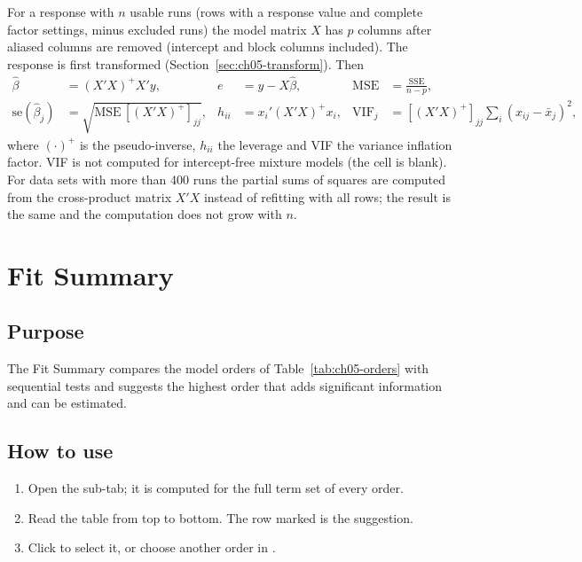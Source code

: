 For a response with $n$ usable runs (rows with a response value and complete factor settings, minus
excluded runs) the model matrix $X$ has $p$ columns after aliased columns are removed (intercept and block
columns included). The response is first transformed (Section~\ref{sec:ch05-transform}). Then
\begin{align}
  \hat\beta&=(X'X)^{+}X'y, &
  e&=y-X\hat\beta, &
  \text{MSE}&=\frac{\text{SSE}}{n-p},\label{eq:ch05-ols}\\
  \text{se}(\hat\beta_j)&=\sqrt{\text{MSE}\,[(X'X)^{+}]_{jj}}, &
  h_{ii}&=x_i'(X'X)^{+}x_i, &
  \text{VIF}_j&=[(X'X)^{+}]_{jj}\sum_i(x_{ij}-\bar x_j)^2,\label{eq:ch05-se}
\end{align}
where $(\cdot)^{+}$ is the pseudo-inverse, $h_{ii}$ the leverage and VIF the variance inflation factor.
VIF is not computed for intercept-free mixture models (the cell is blank). For data sets with more than
400 runs the partial sums of squares are computed from the cross-product matrix $X'X$ instead of
refitting with all rows; the result is the same and the computation does not grow with $n$.

\section{Fit Summary}\label{sec:ch05-fitsummary}

\subsection*{Purpose}
The Fit Summary compares the model orders of Table~\ref{tab:ch05-orders} with sequential tests and suggests
the highest order that adds significant information and can be estimated.

\subsection*{How to use}
\begin{enumerate}
  \item Open the  sub-tab; it is computed for the full term set of every order.
  \item Read the table from top to bottom. The row marked  is the suggestion.
  \item Click  to select it, or choose another order in .
\end{enumerate}

